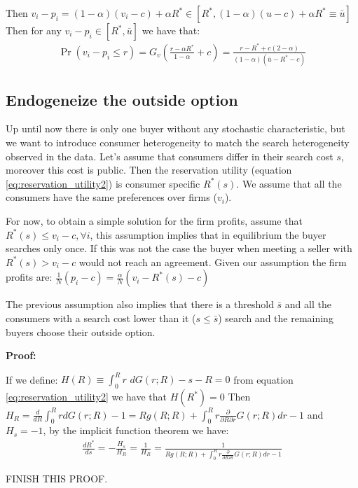 \documentclass[12pt]{article}
\theoremstyle{plain}
\theoremstyle{plain}
\begin{document}
Then $v_i - p_i = (1-\alpha)(v_i -c) +\alpha R^* \in [R^*, (1-\alpha)(u-c)+ \alpha R^*  \equiv \bar{u}] $
Then for any $v_i - p_i  \in [R^*, \bar{u}] $ we have that: 
\begin{align}
    \Pr(v_i - p_i\leq r) = G_v\left(\frac{r-\alpha R^*}{1-\alpha} +c\right) = \frac{r-R^*+c(2-\alpha)}{(1-\alpha)(\bar{u}-R^*-c)}
\end{align}



\subsection{Endogeneize the outside option}

Up until now there is only one buyer without any stochastic characteristic, but we want to introduce consumer heterogeneity to match the search heterogeneity observed in the data. Let's assume that consumers differ in their search cost $s$, moreover this cost is public. Then the reservation utility (equation \ref{eq:reservation_utility2}) is consumer specific $R^*(s)$. We assume that all the consumers have the same preferences over firms ($v_i$). 

For now, to obtain a simple solution for the firm profits, assume that $R^*(s) \leq v_i-c, \forall i$, this assumption implies that in equilibrium the buyer searches only once. If this was not the case the buyer when meeting a seller with $R^*(s) > v_i-c$ would not reach an agreement. Given our assumption the firm profits are: 
$\frac{1}{N} (p_i-c) =\frac{\alpha}{N} ( v_i - R^*(s)- c)$

The previous assumption also implies that there is a threshold $\bar{s}$ and all the consumers with a search cost lower than it ($s\leq\bar{s}$) search and the remaining buyers choose their outside option. 

\textbf{Proof:}

If we define: $H(R)\equiv  \int_0^{R} r \, \, dG(r; R) -s - R = 0 $ from equation \ref{eq:reservation_utility2} we have that $H({R^*}) =0$
Then $H_R = \frac{d}{dR} \int_0^R r dG(r;R) -1= R g(R;R)+\int_0^R r \frac{\partial }{\partial R \partial r}G(r;R) dr-1$ and $H_s = -1$, by the implicit function theorem we have:
\begin{align*}
    \frac{dR^*}{ds}= - \frac{H_s}{H_R} = \frac{1}{H_R} = \frac{1}{ R g(R;R)+\int_0^R r \frac{\partial }{\partial R \partial r}G(r;R) dr-1}
\end{align*}

FINISH THIS PROOF. 
\end{document}

